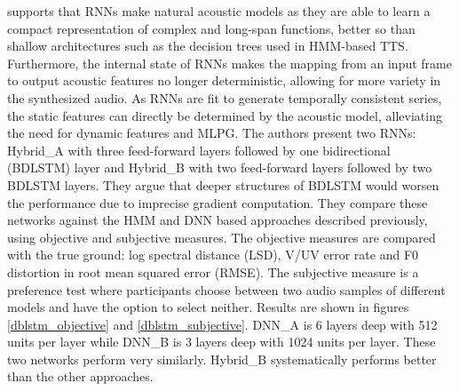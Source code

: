 \documentclass[a4paper, oneside]{article}
\begin{document}
\cite{BDLSTMTTS} supports that RNNs make natural acoustic models as they are able to learn a compact representation of complex and long-span functions, better so than shallow architectures such as the decision trees used in HMM-based TTS. Furthermore, the internal state of RNNs makes the mapping from an input frame to output acoustic features no longer deterministic, allowing for more variety in the synthesized audio. As RNNs are fit to generate temporally consistent series, the static features can directly be determined by the acoustic model, alleviating the need for dynamic features and MLPG. The authors present two RNNs: Hybrid\_A with three feed-forward layers followed by one bidirectional (BDLSTM) layer and Hybrid\_B with two feed-forward layers followed by two BDLSTM layers. They argue that deeper structures of BDLSTM would worsen the performance due to imprecise gradient computation. They compare these networks against the HMM and DNN based approaches described previously, using objective and subjective measures. The objective measures are compared with the true ground: log spectral distance (LSD), V/UV error rate and F0 distortion in root mean squared error (RMSE). The subjective measure is a preference test where participants choose between two audio samples of different models and have the option to select neither. Results are shown in figures \ref{dblstm_objective} and \ref{dblstm_subjective}. DNN\_A is 6 layers deep with 512 units per layer while DNN\_B is 3 layers deep with 1024 units per layer. These two networks perform very similarly. Hybrid\_B systematically performs better than the other approaches.
\end{document}
